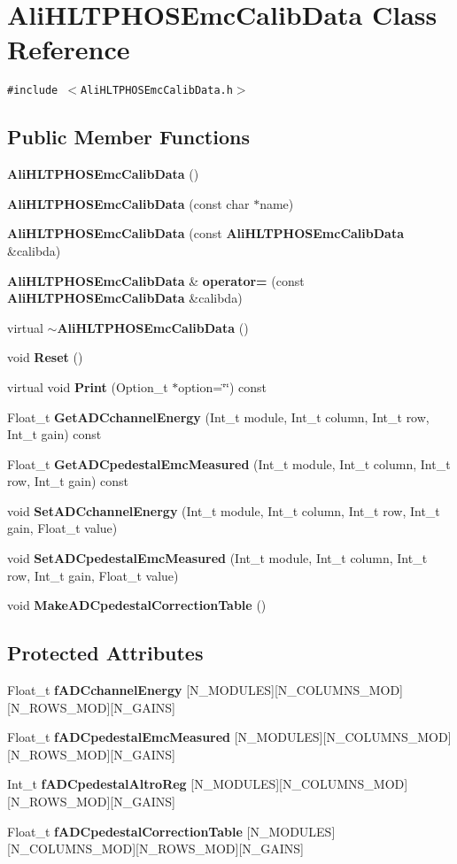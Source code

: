 \section{Ali\-HLTPHOSEmc\-Calib\-Data Class Reference}
\label{classAliHLTPHOSEmcCalibData}
{\tt \#include $<$Ali\-HLTPHOSEmc\-Calib\-Data.h$>$}

\subsection*{Public Member Functions}
\begin{CompactItemize}
\item 
{\bf Ali\-HLTPHOSEmc\-Calib\-Data} ()
\item 
{\bf Ali\-HLTPHOSEmc\-Calib\-Data} (const char $\ast$name)
\item 
{\bf Ali\-HLTPHOSEmc\-Calib\-Data} (const {\bf Ali\-HLTPHOSEmc\-Calib\-Data} \&calibda)
\item 
{\bf Ali\-HLTPHOSEmc\-Calib\-Data} \& {\bf operator=} (const {\bf Ali\-HLTPHOSEmc\-Calib\-Data} \&calibda)
\item 
virtual {\bf $\sim$Ali\-HLTPHOSEmc\-Calib\-Data} ()
\item 
void {\bf Reset} ()
\item 
virtual void {\bf Print} (Option\_\-t $\ast$option=\char`\"{}\char`\"{}) const 
\item 
Float\_\-t {\bf Get\-ADCchannel\-Energy} (Int\_\-t module, Int\_\-t column, Int\_\-t row, Int\_\-t gain) const 
\item 
Float\_\-t {\bf Get\-ADCpedestal\-Emc\-Measured} (Int\_\-t module, Int\_\-t column, Int\_\-t row, Int\_\-t gain) const 
\item 
void {\bf Set\-ADCchannel\-Energy} (Int\_\-t module, Int\_\-t column, Int\_\-t row, Int\_\-t gain, Float\_\-t value)
\item 
void {\bf Set\-ADCpedestal\-Emc\-Measured} (Int\_\-t module, Int\_\-t column, Int\_\-t row, Int\_\-t gain, Float\_\-t value)
\item 
void {\bf Make\-ADCpedestal\-Correction\-Table} ()
\end{CompactItemize}
\subsection*{Protected Attributes}
\begin{CompactItemize}
\item 
Float\_\-t {\bf f\-ADCchannel\-Energy} [N\_\-MODULES][N\_\-COLUMNS\_\-MOD][N\_\-ROWS\_\-MOD][N\_\-GAINS]
\item 
Float\_\-t {\bf f\-ADCpedestal\-Emc\-Measured} [N\_\-MODULES][N\_\-COLUMNS\_\-MOD][N\_\-ROWS\_\-MOD][N\_\-GAINS]
\item 
Int\_\-t {\bf f\-ADCpedestal\-Altro\-Reg} [N\_\-MODULES][N\_\-COLUMNS\_\-MOD][N\_\-ROWS\_\-MOD][N\_\-GAINS]
\item 
Float\_\-t {\bf f\-ADCpedestal\-Correction\-Table} [N\_\-MODULES][N\_\-COLUMNS\_\-MOD][N\_\-ROWS\_\-MOD][N\_\-GAINS]
\end{CompactItemize}


